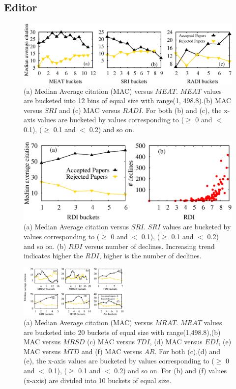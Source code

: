 \noindent
\subsection{Editor}
\label{editor}   

\begin{figure}
\centering
\includegraphics*[width=.48\textwidth]{figures/editor_all.eps}
\caption{\label{fig3}(a) Median Average citation (MAC) versus $MEAT$. $MEAT$ values are bucketed into 12 bins of equal size with range(1, 498.8).(b) MAC versus $SRI$ and (c) MAC versus $RADI$. For both (b) and (c), the x-axis values are bucketed by values corresponding to ($\geq$ 0 and $<$ 0.1), ($\geq$ 0.1 and $<$ 0.2) and so on.}
\end{figure}

\begin{figure}[!ht]
\centering
\includegraphics[scale=0.27]{figures/RDI_RDI_diversity.eps}
\caption{\label{fig_sri} (a) Median Average citation versus $SRI$. $SRI$ values are bucketed by values corresponding to ($\geq$ 0 and $<$ 0.1), ($\geq$ 0.1 and $<$ 0.2) and so on. (b) $RDI$ versus number of declines. Increasing trend indicates higher the $RDI$, higher is the number of declines.}
\end{figure}

\begin{figure}[!ht]
\centering
\includegraphics*[width=0.48\textwidth]{figures/reviewer_all.eps}
\caption{\label{fig5}(a) Median Average citation (MAC) versus $MRAT$. $MRAT$ values are bucketed into 20 buckets of equal size with range(1,498.8),(b) MAC versus $MRSD$ (c) MAC versus $TDI$, (d) MAC versus $EDI$, (e) MAC versus $MTD$ and (f) MAC versus $AR$. For both (c),(d) and (e), the x-axis values are bucketed by values corresponding to ($\geq$ 0 and $<$ 0.1), ($\geq$ 0.1 and $<$ 0.2) and so on. For (b) and (f) values (x-axis) are divided into 10 buckets of equal size.}
\end{figure}

